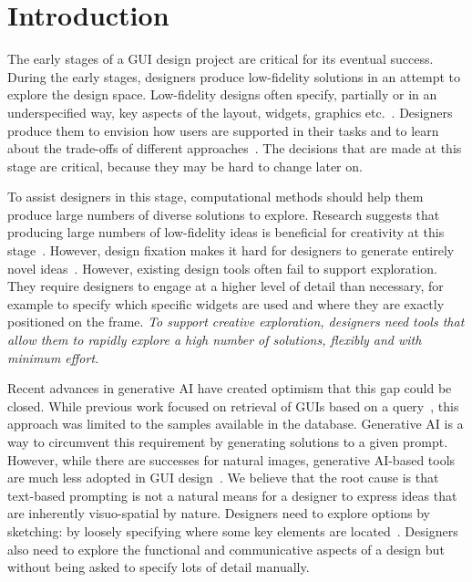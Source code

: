 
\section{Introduction}

The early stages of a GUI design project are critical for its eventual success. 
%
During the early stages, designers produce low-fidelity solutions in an attempt to explore the design space.
Low-fidelity designs often specify, partially or in an underspecified way, key aspects of the layout, widgets, graphics etc.~\cite{landay1996silk}.
Designers produce them to envision how users are supported in their tasks and to learn about the trade-offs of different approaches~\cite{dow2011prototyping, tohidi2006getting}.
% 
The decisions that are made at this stage are critical, because they may be hard to change later on.

To assist designers in this stage, 
computational methods should help them produce large numbers of diverse solutions to explore.
Research suggests that producing large numbers of low-fidelity ideas is beneficial for creativity at this stage~\cite{boyarski1994computers, landay1996silk, rettig1994prototyping}.
However, design fixation makes it hard for designers to generate entirely novel ideas~\cite{jansson1991design}.
However, existing design tools often fail to support exploration.
They require designers to engage at a higher level of detail than necessary, 
for example to specify which specific widgets are used and where they are exactly positioned on the frame.
\emph{To support creative exploration, designers need tools that allow them to rapidly explore a high number of solutions, flexibly and with minimum effort.}

Recent advances in generative AI have created optimism that this gap could be closed. 
While previous work focused on retrieval of GUIs based on a query~\cite{herring2009getting, kumar2013webzeitgeist, li2021screen2vec}, this approach was limited to the samples available in the database.
Generative AI is a way to circumvent this requirement by generating solutions to a given prompt.
%
However, while there are successes for natural images, 
generative AI-based tools are much less adopted in GUI design~\cite{controlnet, controlnet_plus_plus}.
We believe that the root cause is that text-based prompting is not a natural means for a designer to express ideas that are inherently visuo-spatial by nature. 
%
Designers need to explore options by sketching: by loosely specifying where some key elements are located~\cite{landay1996silk}. 
Designers also need to explore the functional and communicative aspects of a design but without being asked to specify lots of detail manually.

